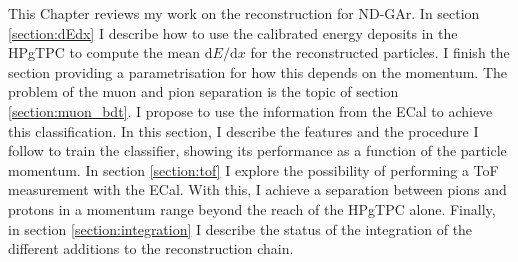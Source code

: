 This Chapter reviews my work on the reconstruction for ND-GAr. In section \ref{section:dEdx} I describe how to use the calibrated energy deposits in the HPgTPC to compute the mean $\mathrm{d}E/\mathrm{d}x$ for the reconstructed particles. I finish the section providing a parametrisation for how this depends on the momentum. The problem of the muon and pion separation is the topic of section \ref{section:muon_bdt}. I propose to use the information from the ECal to achieve this classification. In this section, I describe the features and the procedure I follow to train the classifier, showing its performance as a function of the particle momentum. In section \ref{section:tof} I explore the possibility of performing a ToF measurement with the ECal. With this, I achieve a separation between pions and protons in a momentum range beyond the reach of the HPgTPC alone. Finally, in section \ref{section:integration} I describe the status of the integration of the different additions to the reconstruction chain.